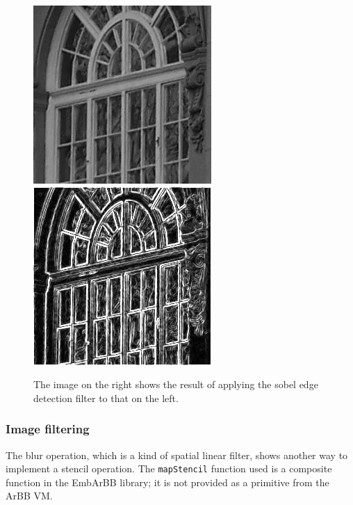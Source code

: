 \begin{figure}
\includegraphics[width=.5\linewidth]{./embarbb/img/window}
\includegraphics[width=.5\linewidth]{./embarbb/img/sobout}
\caption{ The image on the right shows the result of applying the sobel edge 
          detection filter to that on the left. }
\label{fig:sobel}
\end{figure}




\FloatBarrier

\subsubsection{Image filtering} 
\label{sec:Blur}
The blur operation, which is a kind of spatial linear filter, shows another way to implement a stencil operation. The {\tt mapStencil} function used is a composite 
function in the EmbArBB library; it is not provided as a primitive from 
the ArBB VM. 

